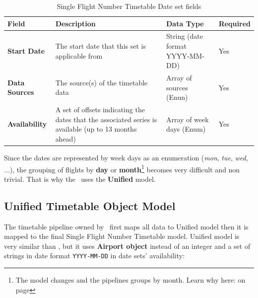\begin{table}[H]
\centering
\begin{tabular}{|>{\raggedright\arraybackslash}p{2.5cm}|>{\raggedright\arraybackslash}p{4.7cm}|>{\raggedright\arraybackslash}p{3cm}|>{\raggedright\arraybackslash}p{2cm}|}
\hline
\textbf{Field}        & \textbf{Description}                                                                                  & \textbf{Data Type}              & \textbf{Required} \\ \hline
\textbf{Start Date}   & The start date that this set is applicable from                                                       & String (date format YYYY-MM-DD) & Yes               \\ \hline
\textbf{Data Sources} & The source(s) of the timetable data                                                                   & Array of sources (Enun)         & Yes               \\ \hline
\textbf{Availability} & A set of offsets indicating the dates that the associated series is available (up to 13 months ahead) & Array of week days (Enum)       & Yes               \\ \hline
\end{tabular}
\caption{Single Flight Number Timetable Date set fields}
\label{sfn-date-set}
\end{table}

Since the dates are represented by week days as an enumeration (\textit{mon}, \textit{tue}, \textit{wed}, ...), the grouping of flights by \textbf{day} or \textbf{month}\footnote{The model changes and the pipelines groups by month. Learn why here:  on page \pageref{month_version}} becomes very difficult and non trivial. That is why the \thesis\ uses the \textbf{Unified} model.

\subsection{Unified Timetable Object Model} \label{unified-model}

The timetable pipeline owned by \squad\ first maps all data to Unified model then it is mapped to the final Single Flight Number Timetable model. Unified model is very similar than , but it uses \textbf{Airport object} instead of an integer and a set of strings in date format \texttt{YYYY-MM-DD} in date sets' availability:

